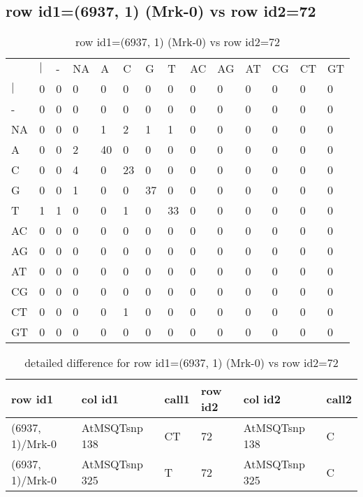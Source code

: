 \subsection{row id1=(6937, 1) (Mrk-0) vs row id2=72}
\begin{center}
\begin{longtable}{|l|l|l|l|l|l|l|l|l|l|l|l|l|l|}
\caption{row id1=(6937, 1) (Mrk-0) vs row id2=72} \label{table_dm142}\\
\hline
\\
\hline
&$|$&-&NA&A&C&G&T&AC&AG&AT&CG&CT&GT\\
$|$&0&0&0&0&0&0&0&0&0&0&0&0&0\\
-&0&0&0&0&0&0&0&0&0&0&0&0&0\\
NA&0&0&0&1&2&1&1&0&0&0&0&0&0\\
A&0&0&2&40&0&0&0&0&0&0&0&0&0\\
C&0&0&4&0&23&0&0&0&0&0&0&0&0\\
G&0&0&1&0&0&37&0&0&0&0&0&0&0\\
T&1&1&0&0&1&0&33&0&0&0&0&0&0\\
AC&0&0&0&0&0&0&0&0&0&0&0&0&0\\
AG&0&0&0&0&0&0&0&0&0&0&0&0&0\\
AT&0&0&0&0&0&0&0&0&0&0&0&0&0\\
CG&0&0&0&0&0&0&0&0&0&0&0&0&0\\
CT&0&0&0&0&1&0&0&0&0&0&0&0&0\\
GT&0&0&0&0&0&0&0&0&0&0&0&0&0\\
\hline
\end{longtable}
\end{center}

\begin{center}
\begin{longtable}{|l|l|l|l|l|l|}
\caption{detailed difference for row id1=(6937, 1) (Mrk-0) vs row id2=72} \label{table_dm143}\\
\hline
row id1&col id1&call1&row id2&col id2&call2\\
\hline
(6937, 1)/Mrk-0&AtMSQTsnp 138&CT&72&AtMSQTsnp 138&C\\
(6937, 1)/Mrk-0&AtMSQTsnp 325&T&72&AtMSQTsnp 325&C\\
\hline
\end{longtable}
\end{center}


